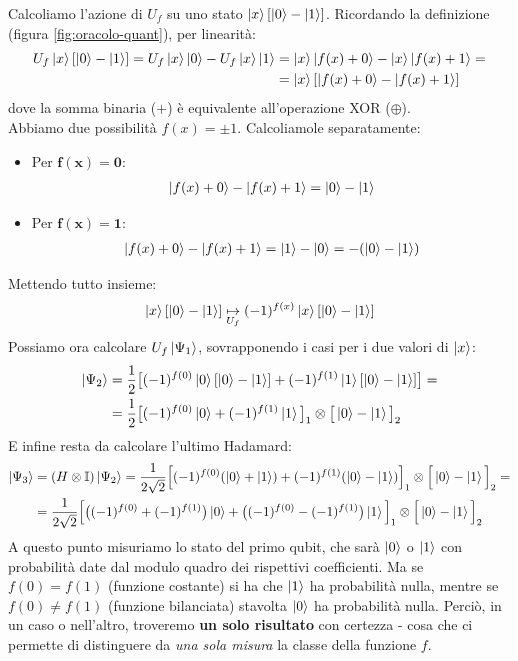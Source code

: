 \documentclass[../../InformazioneQuantistica.tex]{subfiles}
\begin{document}
Calcoliamo l'azione di $U_f$ su uno stato $\Ket{x}[\Ket{0}-\Ket{1}]$. Ricordando la definizione (figura \ref{fig:oracolo-quant}), per linearità:
\begin{align*}
U_f \Ket{x}[\Ket{0}-\Ket{1}] = U_f \Ket{x}\Ket{0}- U_f \Ket{x}\Ket{1} &= \Ket{x}\Ket{f(x)+0} - \Ket{x}\Ket{f(x)+1} =\\
&=\Ket{x}[\Ket{f(x)+0}-\Ket{f(x)+1}]
\end{align*}
dove la somma binaria ($+$) è equivalente all'operazione XOR ($\oplus$).\\
Abbiamo due possibilità $f(x)=\pm 1$. Calcoliamole separatamente:
\begin{itemize}
\item Per $\bm{f(x)=0}$:
\begin{align*}
\Ket{f(x)+0} -\Ket{f(x)+1} = \Ket{0}-\Ket{1}
\end{align*}
\item Per $\bm{f(x)=1}$:
\begin{align*}
\Ket{f(x)+0}-\Ket{f(x)+1} =\Ket{1}-\Ket{0} = -(\Ket{0}-\Ket{1})
\end{align*}
\end{itemize}
Mettendo tutto insieme:
\begin{align*}
\Ket{x}[\Ket{0}-\Ket{1}] \underset{U_f}{\mapsto} (-1)^{f(x)}\Ket{x} [\Ket{0}-\Ket{1}]
\end{align*}
Possiamo ora calcolare $U_f \Ket{\Psi_1}$, sovrapponendo i casi per i due valori di $\Ket{x}$:
\begin{align*}
\Ket{\Psi_2} &= \frac{1}{2}\big[(-1)^{f(0)} \Ket{0}[\Ket{0}-\Ket{1}] + (-1)^{f(1)}\Ket{1}[\Ket{0}-\Ket{1}]\big] = \\
&= \frac{1}{2}\big[ (-1)^{f(0)} \Ket{0} + (-1)^{f(1)} \Ket{1}\big]_1 \otimes \big[\Ket{0}-\Ket{1}\big]_2
\end{align*}
E infine resta da calcolare l'ultimo Hadamard:
\begin{align*}
\Ket{\Psi_3} &= (H\otimes \mathbb{I}) \Ket{\Psi_2} = \frac{1}{2\sqrt{2}} \Big [
(-1)^{f(0)} (\Ket{0} + \Ket{1}) + (-1)^{f(1)} (\Ket{0}-\Ket{1}) 
\Big ]_1 \otimes \Big[ \Ket{0} - \Ket{1} \Big]_2 = \\
&= \frac{1}{2\sqrt{2}} \Big[\big((-1)^{f(0)} + (-1)^{f(1)}\big) \Ket{0} + \big((-1)^{f(0)} - (-1)^{f(1)} \big)\Ket{1}\Big]_1 \otimes \Big[\Ket{0}-\Ket{1}\Big]_2
\end{align*}
A questo punto misuriamo lo stato del primo qubit, che sarà $\Ket{0}$ o $\Ket{1}$ con probabilità date dal modulo quadro dei rispettivi coefficienti. Ma se $f(0)=f(1)$ (funzione costante) si ha che $\Ket{1}$ ha probabilità nulla, mentre se $f(0)\neq f(1)$ (funzione bilanciata) stavolta $\Ket{0}$ ha probabilità nulla. Perciò, in un caso o nell'altro, troveremo \textbf{un solo risultato} con certezza - cosa che ci permette di distinguere da \textit{una sola misura} la classe della funzione $f$.\\
\end{document}
